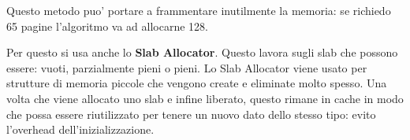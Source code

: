     Questo metodo puo' portare a frammentare inutilmente la memoria: se richiedo 65 pagine
    l'algoritmo va ad allocarne 128.  

    Per questo si usa anche lo \textbf{Slab Allocator}. Questo lavora sugli slab che possono essere:
    vuoti, parzialmente pieni o pieni. 
    Lo Slab Allocator viene usato per strutture di memoria piccole che vengono create e eliminate molto spesso.
    Una volta che viene allocato uno slab e infine liberato, questo rimane in cache in modo che possa essere riutilizzato
    per tenere un nuovo dato dello stesso tipo: evito l'overhead dell'inizializzazione. 